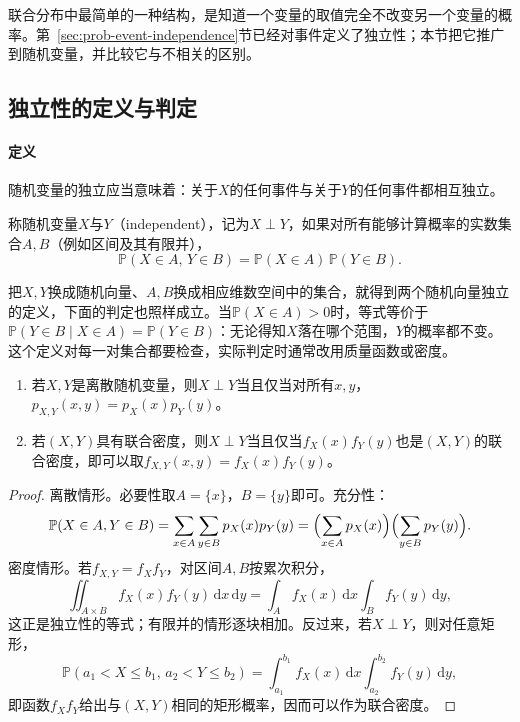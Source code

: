 联合分布中最简单的一种结构，是知道一个变量的取值完全不改变另一个变量的概率。第~\ref{sec:prob-event-independence}节已经对事件定义了独立性；本节把它推广到随机变量，并比较它与不相关的区别。

\subsection{独立性的定义与判定}

\paragraph{定义}
随机变量的独立应当意味着：关于$X$的任何事件与关于$Y$的任何事件都相互独立。

\begin{definition}[随机变量的独立性]
称随机变量$X$与$Y$（independent），记为$X\perp Y$，如果对所有能够计算概率的实数集合$A,B$（例如区间及其有限并），
\[
 \mathbb P(X\in A,\,Y\in B)=\mathbb P(X\in A)\,\mathbb P(Y\in B).
\]
\end{definition}

把$X,Y$换成随机向量、$A,B$换成相应维数空间中的集合，就得到两个随机向量独立的定义，下面的判定也照样成立。当$\mathbb P(X\in A)>0$时，等式等价于$\mathbb P(Y\in B\mid X\in A)=\mathbb P(Y\in B)$：无论得知$X$落在哪个范围，$Y$的概率都不变。这个定义对每一对集合都要检查，实际判定时通常改用质量函数或密度。

\begin{theorem}[独立性的判定]
\label{thm:rvec-independence-criteria}
\begin{enumerate}
 \item 若$X,Y$是离散随机变量，则$X\perp Y$当且仅当对所有$x,y$，$p_{X,Y}(x,y)=p_X(x)p_Y(y)$。
 \item 若$(X,Y)$具有联合密度，则$X\perp Y$当且仅当$f_X(x)f_Y(y)$也是$(X,Y)$的联合密度，即可以取$f_{X,Y}(x,y)=f_X(x)f_Y(y)$。
\end{enumerate}
\end{theorem}

\begin{proof}
离散情形。必要性取$A=\{x\}$，$B=\{y\}$即可。充分性：
\[
 \mathbb P(X\in A,Y\in B)=\sum_{x\in A}\sum_{y\in B}p_X(x)p_Y(y)
 =\Bigl(\sum_{x\in A}p_X(x)\Bigr)\Bigl(\sum_{y\in B}p_Y(y)\Bigr).
\]
密度情形。若$f_{X,Y}=f_Xf_Y$，对区间$A,B$按累次积分，
\[
 \iint_{A\times B}f_X(x)f_Y(y)\,\mathrm dx\,\mathrm dy=\int_Af_X(x)\,\mathrm dx\int_Bf_Y(y)\,\mathrm dy ,
\]
这正是独立性的等式；有限并的情形逐块相加。反过来，若$X\perp Y$，则对任意矩形，
\[
 \mathbb P(a_1<X\le b_1,\,a_2<Y\le b_2)=\int_{a_1}^{b_1}f_X(x)\,\mathrm dx\int_{a_2}^{b_2}f_Y(y)\,\mathrm dy ,
\]
即函数$f_Xf_Y$给出与$(X,Y)$相同的矩形概率，因而可以作为联合密度。
\end{proof}

